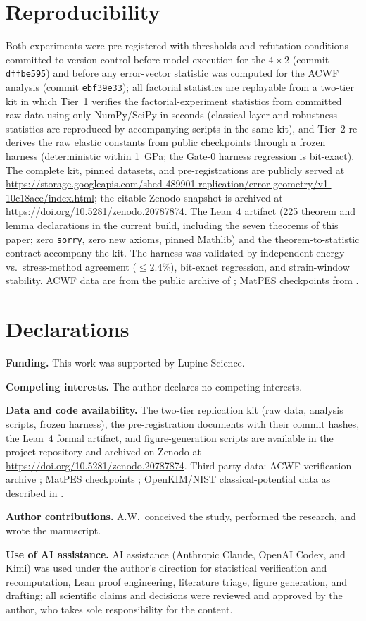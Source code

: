 \documentclass[11pt]{article}
\theoremstyle{remark}
\begin{document}
\section{Reproducibility}
\label{sec:repro}

Both experiments were pre-registered with thresholds and refutation
conditions committed to version control before model execution for the
$4{\times}2$ (commit \texttt{dffbe595}) and before any error-vector statistic
was computed for the ACWF analysis (commit \texttt{ebf39e33}); all factorial
statistics are replayable from a two-tier kit in which Tier~1 verifies the
factorial-experiment statistics from committed raw data using only
NumPy/SciPy in seconds (classical-layer and robustness statistics are
reproduced by accompanying scripts in the same kit), and Tier~2 re-derives
the raw elastic constants from public checkpoints through a frozen harness
(deterministic within 1~GPa; the Gate-0 harness regression is bit-exact).
The complete kit, pinned datasets, and pre-registrations are publicly served
at \url{https://storage.googleapis.com/shed-489901-replication/error-geometry/v1-10c18ace/index.html};
the citable Zenodo snapshot is archived at
\url{https://doi.org/10.5281/zenodo.20787874}.
The Lean~4 artifact (225 theorem and lemma declarations in the current
build, including the seven theorems of this paper; zero \texttt{sorry}, zero
new axioms, pinned Mathlib) and the theorem-to-statistic contract accompany
the kit. The harness was validated by independent energy- vs.\ stress-method
agreement ($\le 2.4\%$), bit-exact regression, and strain-window stability.
ACWF data are from the public archive of \citep{bosoni2024}; MatPES
checkpoints from \citep{kaplan2025}.

\section*{Declarations}

\textbf{Funding.} This work was supported by Lupine Science.

\textbf{Competing interests.} The author declares no competing interests.

\textbf{Data and code availability.} The two-tier replication kit (raw data,
analysis scripts, frozen harness), the pre-registration documents with their
commit hashes, the Lean~4 formal artifact, and figure-generation scripts are
available in the project repository and archived on Zenodo at
\url{https://doi.org/10.5281/zenodo.20787874}. Third-party data: ACWF verification archive \citep{bosoni2024};
MatPES checkpoints \citep{kaplan2025}; OpenKIM/NIST classical-potential data
as described in \citep{welcing2026instance}.

\textbf{Author contributions.} A.W.\ conceived the study, performed the
research, and wrote the manuscript.

\textbf{Use of AI assistance.} AI assistance (Anthropic Claude, OpenAI Codex, and Kimi) was used
under the author's direction for statistical verification and recomputation,
Lean proof engineering, literature triage, figure generation, and drafting;
all scientific claims and decisions were reviewed and approved by the author,
who takes sole responsibility for the content.



\end{document}
